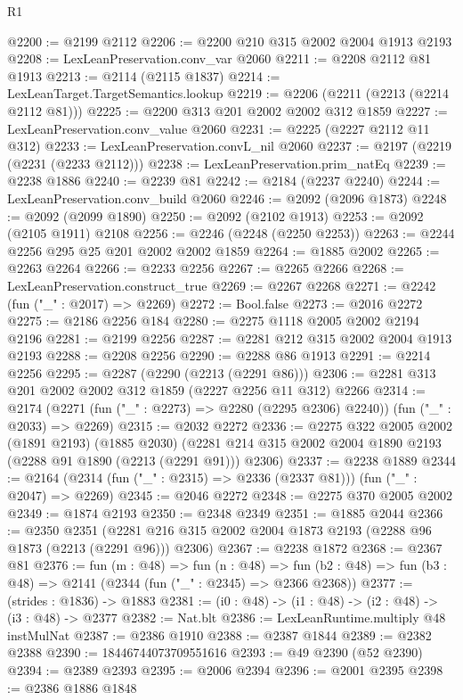 \begin{lexlean}{R1}
\begin{coremodule}
@2200 := @2199 @2112
@2206 := @2200 @210 @315 @2002 @2004 @1913 @2193
@2208 := LexLeanPreservation.conv_var @2060
@2211 := @2208 @2112 @81 @1913
@2213 := @2114 (@2115 @1837)
@2214 := LexLeanTarget.TargetSemantics.lookup
@2219 := @2206 (@2211 (@2213 (@2214 @2112 @81)))
@2225 := @2200 @313 @201 @2002 @2002 @312 @1859
@2227 := LexLeanPreservation.conv_value @2060
@2231 := @2225 (@2227 @2112 @11 @312)
@2233 := LexLeanPreservation.convL_nil @2060
@2237 := @2197 (@2219 (@2231 (@2233 @2112)))
@2238 := LexLeanPreservation.prim_natEq
@2239 := @2238 @1886
@2240 := @2239 @81
@2242 := @2184 (@2237 @2240)
@2244 := LexLeanPreservation.conv_build @2060
@2246 := @2092 (@2096 @1873)
@2248 := @2092 (@2099 @1890)
@2250 := @2092 (@2102 @1913)
@2253 := @2092 (@2105 @1911) @2108
@2256 := @2246 (@2248 (@2250 @2253))
@2263 := @2244 @2256 @295 @25 @201 @2002 @2002 @1859
@2264 := @1885 @2002
@2265 := @2263 @2264
@2266 := @2233 @2256
@2267 := @2265 @2266
@2268 := LexLeanPreservation.construct_true
@2269 := @2267 @2268
@2271 := @2242 (fun ("_" : @2017) => @2269)
@2272 := Bool.false
@2273 := @2016 @2272
@2275 := @2186 @2256 @184
@2280 := @2275 @1118 @2005 @2002 @2194 @2196
@2281 := @2199 @2256
@2287 := @2281 @212 @315 @2002 @2004 @1913 @2193
@2288 := @2208 @2256
@2290 := @2288 @86 @1913
@2291 := @2214 @2256
@2295 := @2287 (@2290 (@2213 (@2291 @86)))
@2306 := @2281 @313 @201 @2002 @2002 @312 @1859 (@2227 @2256 @11 @312) @2266
@2314 := @2174 (@2271 (fun ("_" : @2273) => @2280 (@2295 @2306) @2240)) (fun ("_" : @2033) => @2269)
@2315 := @2032 @2272
@2336 := @2275
    @322
    @2005
    @2002
    (@1891 @2193)
    (@1885 @2030)
    (@2281 @214 @315 @2002 @2004 @1890 @2193 (@2288 @91 @1890 (@2213 (@2291 @91))) @2306)
@2337 := @2238 @1889
@2344 := @2164 (@2314 (fun ("_" : @2315) => @2336 (@2337 @81))) (fun ("_" : @2047) => @2269)
@2345 := @2046 @2272
@2348 := @2275 @370 @2005 @2002
@2349 := @1874 @2193
@2350 := @2348 @2349
@2351 := @1885 @2044
@2366 := @2350
    @2351
    (@2281 @216 @315 @2002 @2004 @1873 @2193 (@2288 @96 @1873 (@2213 (@2291 @96))) @2306)
@2367 := @2238 @1872
@2368 := @2367 @81
@2376 := fun (m : @48) =>
  fun (n : @48) =>
  fun (b2 : @48) => fun (b3 : @48) => @2141 (@2344 (fun ("_" : @2345) => @2366 @2368))
@2377 := (strides : @1836) -> @1883
@2381 := (i0 : @48) -> (i1 : @48) -> (i2 : @48) -> (i3 : @48) -> @2377
@2382 := Nat.blt
@2386 := LexLeanRuntime.multiply @48 instMulNat
@2387 := @2386 @1910
@2388 := @2387 @1844
@2389 := @2382 @2388
@2390 := 18446744073709551616
@2393 := @49 @2390 (@52 @2390)
@2394 := @2389 @2393
@2395 := @2006 @2394
@2396 := @2001 @2395
@2398 := @2386 @1886 @1848

\end{coremodule}
\end{lexlean}

